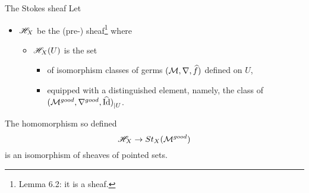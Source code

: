 \begin{frame}[t]{The Stokes sheaf}
  Let
  \begin{itemize}
    \item $\mathscr{H}_X$ be the (pre-) sheaf\footnote{Lemma 6.2: it is a sheaf.} where
      \begin{itemize}
        \item $\mathscr{H}_X(U)$ is the set
          \begin{itemize}
            \item of isomorphism classes of germs $(\mathcal{M},\nabla,\widehat f)$ defined
              on $U$,
            \item equipped with a distinguished element, namely, the class of
              ${(\mathcal{M}^{good},\nabla^{good},\widehat{\operatorname{Id}})}_{|U}$.
          \end{itemize}
      \end{itemize}
  \end{itemize}
  \begin{thm}
    The homomorphism so defined
    \[
      \mathscr{H}_X\to St_X(\mathcal{M}^{good})
    \]
    is an isomorphism of sheaves of pointed sets.
  \end{thm}
\end{frame}
